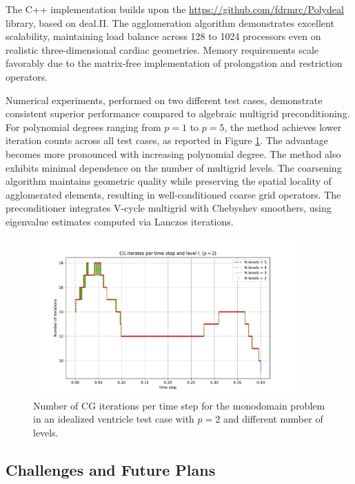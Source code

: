 \documentclass[a4paper,12pt]{article}
\begin{document}
The C++ implementation builds upon the \url{https://github.com/fdrmrc/Polydeal} library, based on deal.II. The agglomeration algorithm demonstrates excellent scalability, maintaining load balance across 128 to 1024 processors even on realistic three-dimensional cardiac geometries. Memory requirements scale favorably due to the matrix-free implementation of prolongation and restriction operators.

Numerical experiments, performed on two different test cases, demonstrate consistent superior performance compared to algebraic multigrid preconditioning. For polynomial degrees ranging from $p=1$ to $p=5$, the method achieves lower iteration counts across all test cases, as reported in Figure \ref{fig:iterates_level_3D_monodomain_p_2}. The advantage becomes more pronounced with increasing polynomial degree. The method also exhibits minimal dependence on the number of multigrid levels. The coarsening algorithm maintains geometric quality while preserving the spatial locality of agglomerated elements, resulting in well-conditioned coarse grid operators. The preconditioner integrates V-cycle multigrid with Chebyshev smoothers, using eigenvalue estimates computed via Lanczos iterations.

\begin{figure}[!htb]
    \centering
    \includegraphics[width=0.9\textwidth]{l_p_2.pdf}
    \caption{Number of CG iterations per time step for the monodomain problem in an idealized ventricle test case with $p=2$ and different number of levels.}
    \label{fig:iterates_level_3D_monodomain_p_2}
\end{figure}


 \subsection{Challenges and Future Plans}
\end{document}

